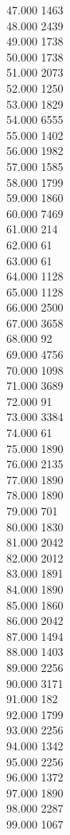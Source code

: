 { 47.000	1463 \\
 48.000	2439 \\
 49.000	1738 \\
 50.000	1738 \\
 51.000	2073 \\
 52.000	1250 \\
 53.000	1829 \\
 54.000	6555 \\
 55.000	1402 \\
 56.000	1982 \\
 57.000	1585 \\
 58.000	1799 \\
 59.000	1860 \\
 60.000	7469 \\
 61.000	214 \\
 62.000	61 \\
 63.000	61 \\
 64.000	1128 \\
 65.000	1128 \\
 66.000	2500 \\
 67.000	3658 \\
 68.000	92 \\
 69.000	4756 \\
 70.000	1098 \\
 71.000	3689 \\
 72.000	91 \\
 73.000	3384 \\
 74.000	61 \\
 75.000	1890 \\
 76.000	2135 \\
 77.000	1890 \\
 78.000	1890 \\
 79.000	701 \\
 80.000	1830 \\
 81.000	2042 \\
 82.000	2012 \\
 83.000	1891 \\
 84.000	1890 \\
 85.000	1860 \\
 86.000	2042 \\
 87.000	1494 \\
 88.000	1403 \\
 89.000	2256 \\
 90.000	3171 \\
 91.000	182 \\
 92.000	1799 \\
 93.000	2256 \\
 94.000	1342 \\
 95.000	2256 \\
 96.000	1372 \\
 97.000	1890 \\
 98.000	2287 \\
 99.000	1067 \\
}
